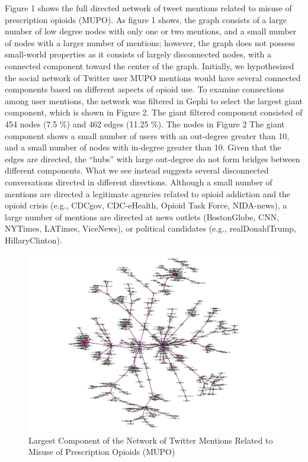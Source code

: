 \documentclass[sigconf]{acmart}
\begin{document}
Figure 1 shows the full directed network of tweet mentions related to misuse
of prescription opioids (MUPO). As figure 1 shows, the graph consists of a 
large number of low degree nodes with only one or two mentions, and a small 
number of nodes with a larger number of mentions; however, the graph does 
not possess small-world properties as it consists of largely disconnected 
nodes, with a connected component toward the center of the graph. 
Initially, we hypothesized the social network of Twitter user MUPO mentions 
would have several connected components based on different aspects of opioid use.  
To examine connections among user mentions, the network was filtered in Gephi 
to select the largest giant component, which is shown in Figure 2. The giant 
filtered component consisted of 454 nodes (7.5 \%) and 462 edges (11.25 \%). 
The nodes in Figure 2  The giant component shows a small number of users 
with an out-degree greater than 10, and a small number of nodes with in-degree 
greater than 10. Given that the edges are directed, the ``hubs'' with 
large out-degree do not form bridges between different components. What we
see instead suggests several disconnected conversations directed in different
directions. Although a small number of mentions are directed a legitimate 
agencies related to opioid addiction and the opioid crisis (e.g., CDCgov, 
CDC-eHealth, Opioid Task Force, NIDA-news), a large number of mentions are 
directed at news outlets (BostonGlobe, CNN, NYTimes, LATimes, ViceNews), or 
political candidates (e.g., realDonaldTrump, HillaryClinton). 

\begin{figure}[!ht]
  \centering\includegraphics[width=\columnwidth]{images/Figure2.pdf}
  \caption{Largest Component of the Network of Twitter Mentions Related to 
  Misuse of Prescription Opioids (MUPO)}
  \label{f:Figure2}
\end{figure}
\end{document}
